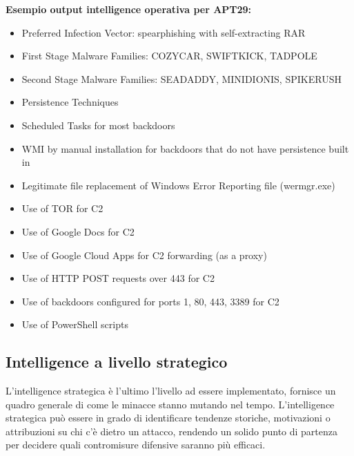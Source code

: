 \begin{center}
    \noindent\textbf{Esempio output intelligence operativa per APT29:}\newline\newline
    \begin{varwidth}{\textwidth}
        \begin{itemize}
            \item Preferred Infection Vector: spearphishing with self-extracting RAR
            \item First Stage Malware Families: COZYCAR, SWIFTKICK, TADPOLE
            \item Second Stage Malware Families: SEADADDY, MINIDIONIS, SPIKERUSH
            \item Persistence Techniques
            \item Scheduled Tasks for most backdoors
            \item WMI by manual installation for backdoors that do not have persistence built in
            \item Legitimate file replacement of Windows Error Reporting file (wermgr.exe)
            \item Use of TOR for C2
            \item Use of Google Docs for C2
            \item Use of Google Cloud Apps for C2 forwarding (as a proxy)
            \item Use of HTTP POST requests over 443 for C2
            \item Use of backdoors configured for ports 1, 80, 443, 3389 for C2
            \item Use of PowerShell scripts
        \end{itemize}
    \end{varwidth}
\end{center}


\newpage


\subsection{Intelligence a livello strategico}

L’intelligence strategica è l’ultimo l’livello ad essere implementato, fornisce un quadro generale di come le minacce stanno mutando nel tempo. L'intelligence strategica può essere in grado di identificare tendenze storiche, motivazioni o attribuzioni su chi c'è dietro un attacco, rendendo un solido punto di partenza per decidere quali contromisure difensive saranno più efficaci.

